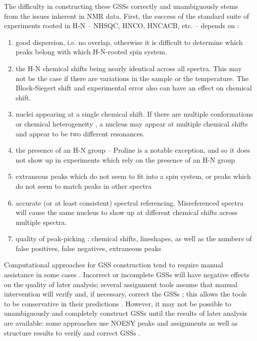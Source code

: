 The difficulty in constructing these GSSs correctly and unambiguously stems 
from the issues inherent in NMR data.  First, the success of the standard 
suite of experiments rooted in H-N -- NHSQC, HNCO, HNCACB, etc. -- depends 
on \cite{autoassign1997}: %
\begin{enumerate}
  \item good dispersion, i.e. no overlap, otherwise it is difficult to determine 
    which peaks belong with which H-N-rooted spin system.
  \item the H-N chemical shifts being nearly identical across all spectra.  
    This may not be the case if there are variations in the sample or the 
    temperature.  The Block-Siegert shift and experimental error also can have 
    an effect on chemical shift.
  \item nuclei appearing at a single chemical shift.  If there are multiple 
    conformations or chemical heterogeneity \cite{autoassign1997}, 
    a nucleus may appear at multiple chemical shifts and appear to be two 
    different resonances.
  \item the presence of an H-N group -- Proline is a notable exception, and 
    so it does not show up in experiments which rely on the presence of an H-N group
  \item extraneous peaks which do not seem to fit into a spin system, or 
    peaks which do not seem to match peaks in other spectra
  \item accurate (or at least consistent) spectral referencing.  
    Misreferenced spectra will cause the same nucleus to show up at different 
    chemical shifts across multiple spectra.
  \item quality of peak-picking \cite{autoassign1997, mars}: 
    chemical shifts, lineshapes, as well as the numbers of 
    false positives, false negatives, extraneous peaks
\end{enumerate}

Computational approaches for GSS construction tend to require manual 
assistance in some cases \cite{autoassign1997, mars}.  Incorrect or 
incomplete GSSs will have negative effects on the quality of later 
analysis; several assignment tools assume that manual intervention will 
verify and, if necessary, correct the GSSs \cite{williamson2009automated}; 
this allows the tools to be conservative in their 
predictions \cite{autoassign1997}.  However, it may not be 
possible to unambiguously and completely construct GSSs until the results 
of later analysis are available: some approaches use NOESY peaks and 
assignments as well as structure results to verify and correct GSSs 
\cite{autoassign1997}.

